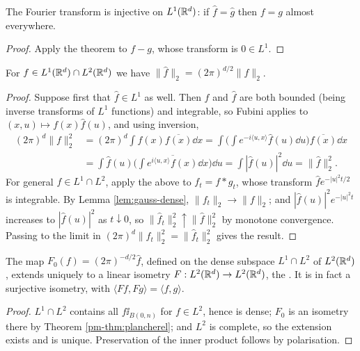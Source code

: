 \documentclass[a4paper]{scrartcl}
\newcommand{\ip}[2]{\langle #1, #2 \rangle}
\newcommand{\ind}{\ii}
\begin{document}
\begin{corollary}
	The Fourier transform is injective on $L^1(\mathbb{R}^d)$: if $\hat f = \hat g$ then $f = g$ almost everywhere.
\end{corollary}
\begin{proof}
	Apply the theorem to $f - g$, whose transform is $0 \in L^1$.
\end{proof}

\begin{theorem}\label{pm-thm:plancherel}
	For $f \in L^1(\mathbb{R}^d)\cap L^2(\mathbb{R}^d)$ we have $\|\hat f\|_2 = (2\pi)^{d/2}\|f\|_2$.
\end{theorem}
\begin{proof}
	Suppose first that $\hat f \in L^1$ as well. Then $f$ and $\hat f$ are both bounded (being inverse transforms of $L^1$ functions) and integrable, so Fubini applies to $(x,u)\mapsto f(x)\hat f(u)$, and using inversion,
	\begin{align*}
		(2\pi)^d\|f\|_2^2 &= (2\pi)^d\int f(x)\overline{f(x)}\dd x = \int\Big(\int e^{-i\ip{u}{x}}\hat f(u)\dd u\Big)\overline{f(x)}\dd x\\
		&= \int \hat f(u)\overline{\Big(\int e^{i\ip{u}{x}}f(x)\dd x\Big)}\dd u = \int|\hat f(u)|^2\dd u = \|\hat f\|_2^2.
	\end{align*}
	For general $f \in L^1\cap L^2$, apply the above to $f_t = f * g_t$, whose transform $\hat f e^{-|u|^2t/2}$ is integrable. By Lemma \ref{lem:gauss-dense}, $\|f_t\|_2 \to \|f\|_2$; and $|\hat f(u)|^2e^{-|u|^2t}$ increases to $|\hat f(u)|^2$ as $t\downarrow0$, so $\|\hat f_t\|_2^2 \uparrow \|\hat f\|_2^2$ by monotone convergence. Passing to the limit in $(2\pi)^d\|f_t\|_2^2 = \|\hat f_t\|_2^2$ gives the result.
\end{proof}

\begin{corollary}
	The map $F_0(f)=(2\pi)^{-d/2}\hat f$, defined on the dense subspace $L^1\cap L^2$ of $L^2(\mathbb{R}^d)$, extends uniquely to a linear isometry $F : L^2(\mathbb{R}^d)\to L^2(\mathbb{R}^d)$, the . It is in fact a surjective isometry, with $\ip{Ff}{Fg}=\ip{f}{g}$.
\end{corollary}
\begin{proof}
	$L^1 \cap L^2$ contains all $f\ind_{B(0,n)}$ for $f \in L^2$, hence is dense; $F_0$ is an isometry there by Theorem \ref{pm-thm:plancherel}; and $L^2$ is complete, so the extension exists and is unique. Preservation of the inner product follows by polarisation.
\end{proof}
\end{document}
